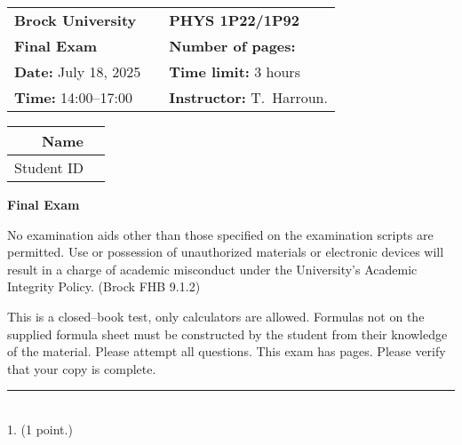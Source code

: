 \documentclass[12pt]{article}
\newcommand{\thinrule}{\noindent\rule{\linewidth}{0.5pt}}
\begin{document}
\thispagestyle{empty}
\begin{center}
\vspace{0.15in}
{\large
\begin{tabular}{lcl} 
{\bf Brock University} & \hspace*{0.3in} &  {\bf PHYS 1P22/1P92}  \\
{\bf Final Exam}       & & {\bf Number of pages:} \pageref{LastPage}  \\
{\bf Date:} July 18, 2025	& & {\bf Time limit:} 3 hours                  \\
{\bf Time:} 14:00--17:00     & & {\bf Instructor:} T.~Harroun.
\end{tabular}
}
\end{center}

\begin{center}

{\Large
\begin{tabular}{|r|c|}
\hline
Name	   & \hspace*{3.5in}	\\ \hline
Student ID &            	    \\ \hline
\end{tabular}
}
\end{center} 


\vspace{0cm}
\begin{center}
\textbf{Final Exam}
\end{center}

\vspace{1em}
%
No examination aids other than those specified on the examination scripts are permitted. Use or possession of unauthorized materials or electronic devices will result in a charge of academic misconduct under the University’s Academic Integrity Policy. (Brock FHB 9.1.2) 

This is a closed--book test, only calculators are allowed. Formulas not on the supplied formula sheet must be constructed by the student from their knowledge of the material. Please attempt all questions. This exam has \pageref{LastPage} pages. Please verify that your copy is complete.



\clearpage
\thinrule\\
1. (1 point.)
\end{document}
